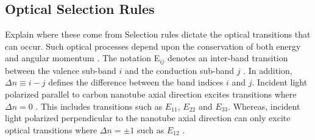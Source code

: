 \subsection{Optical Selection Rules}

{\color{red} Explain where these come from}
Selection rules dictate the optical transitions that can occur. Such optical processes depend upon the conservation of both energy and angular momentum \cite{weismanKonoBook}. The notation E$_{ij}$ denotes an inter-band transition between the valence sub-band $i$ and the conduction sub-band $j$ \cite{weismanKonoBook}. In addition, $\Delta n \equiv i - j$ defines the difference between the band indices $i$ and $j$.  Incident light polarized parallel to carbon nanotube axial direction excites transitions where $\Delta n = 0$ \cite{weismanKonoBook}. This includes transitions such as $E_{11}$, $E_{22}$ and $E_{33}$. Whereas, incident light polarized perpendicular to the nanotube axial direction can only excite optical transitions where $\Delta n = \pm 1$ such as $E_{12}$ \cite{weismanKonoBook}. 

